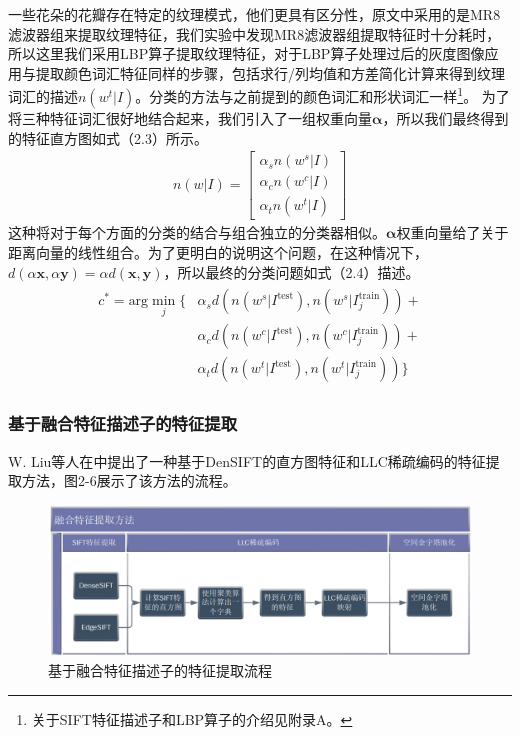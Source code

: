 \documentclass[supercite]{HustGraduPaper}
\begin{document}
\begin{sloppypar}
  一些花朵的花瓣存在特定的纹理模式，他们更具有区分性，原文\cite{1640927}中采用的是MR8滤波器组来提取纹理特征，我们实验中发现MR8滤波器组提取特征时十分耗时，所以这里我们采用LBP算子提取纹理特征，对于LBP算子处理过后的灰度图像应用与提取颜色词汇特征同样的步骤，包括求行/列均值和方差简化计算来得到纹理词汇的描述$n(w^t|I)$。分类的方法与之前提到的颜色词汇和形状词汇一样\footnote{关于SIFT特征描述子和LBP算子的介绍见附录A。}。
  为了将三种特征词汇很好地结合起来，我们引入了一组权重向量$\bm{\alpha}$，所以我们最终得到的特征直方图如式（2.3）所示。\begin{gather}
  n(w|I)=\begin{bmatrix}
    \alpha_sn(w^s|I)\\
    \alpha_cn(w^c|I)\\
    \alpha_tn(w^t|I)
  \end{bmatrix}
  \end{gather}
  这种将对于每个方面的分类的结合与组合独立的分类器相似。$\bm{\alpha}$权重向量给了关于距离向量的线性组合。为了更明白的说明这个问题，在这种情况下，$d(\alpha\bm{x},\alpha\bm{y})=\alpha d(\bm{x},\bm{y})$，所以最终的分类问题如式（2.4）描述。\begin{gather}
  \begin{array}{ll}
   c^*=\text{arg}\min_j\{ & \alpha_sd(n(w^s|I^{\text{test}}),n(w^s|I_j^{\text{train}}))+\\
   &\alpha_cd(n(w^c|I^{\text{test}}),n(w^c|I_j^{\text{train}}))+\\
   &\alpha_td(n(w^t|I^{\text{test}}),n(w^t|I_j^{\text{train}})) \}
  \end{array}
  \end{gather}
  \subsubsection{基于融合特征描述子的特征提取}
  W. Liu等人在\cite{8090865}中提出了一种基于DenSIFT的直方图特征和LLC稀疏编码的特征提取方法，图2-6展示了该方法的流程。
  \begin{figure}[H]
    \setlength{\abovecaptionskip}{0.2cm}
    \setlength{\belowcaptionskip}{-0.cm}
      \centering%
      \includegraphics[scale=0.6]{9.jpg}
      \caption{基于融合特征描述子的特征提取流程}
    \end{figure}


\end{sloppypar}
\end{document}
